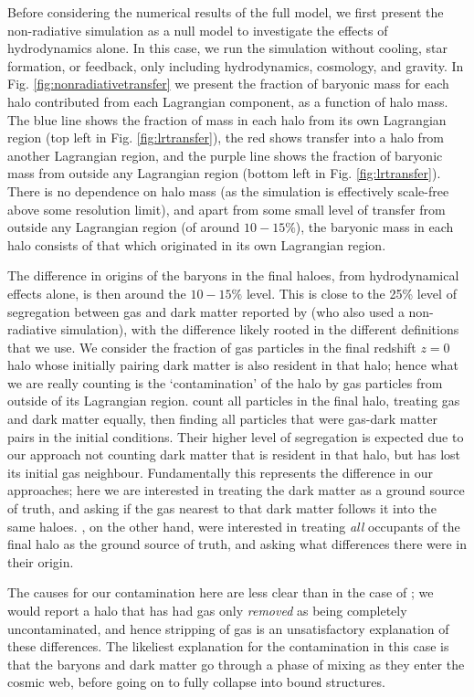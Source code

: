 Before considering the numerical results of the full model, we first present
the non-radiative simulation as a null model to investigate the effects of
hydrodynamics alone. In this case, we run the simulation without cooling,
star formation, or feedback, only including hydrodynamics, cosmology, and
gravity. In Fig. \ref{fig:nonradiativetransfer} we present the fraction of
baryonic mass for each halo contributed from each Lagrangian component, as a
function of halo mass. The blue line shows the fraction of mass in each halo
from its own Lagrangian region (top left in Fig. \ref{fig:lrtransfer}), the
red shows transfer into a halo from another Lagrangian region, and the purple
line shows the fraction of baryonic mass from outside any Lagrangian region
(bottom left in Fig. \ref{fig:lrtransfer}). There is no dependence on halo
mass (as the simulation is effectively scale-free above some resolution
limit), and apart from some small level of transfer from outside any
Lagrangian region (of around $10-15\%$), the baryonic mass in each halo
consists of that which originated in its own Lagrangian region.

The difference in origins of the baryons in the final haloes, from
hydrodynamical effects alone, is then around the $10-15\%$ level. This is
close to the 25\% level of segregation between gas and dark matter reported
by \citet{Liao2017} (who also used a non-radiative simulation), with the
difference likely rooted in the different definitions that we use. We
consider the fraction of gas particles in the final redshift $z=0$ halo whose
initially pairing dark matter is also resident in that halo; hence what we
are really counting is the `contamination' of the halo by gas particles from
outside of its Lagrangian region. \citet{Liao2017} count all particles in the
final halo, treating gas and dark matter equally, then finding all particles
that were gas-dark matter pairs in the initial conditions. Their higher level
of segregation is expected due to our approach not counting dark matter that
is resident in that halo, but has lost its initial gas neighbour. Fundamentally this
represents the difference in our approaches; here we are interested in
treating the dark matter as a ground source of truth, and asking if the gas
nearest to that dark matter follows it into the same haloes.
\citet{Liao2017}, on the other hand, were interested in treating \emph{all}
occupants of the final halo as the ground source of truth, and asking
what differences there were in their origin.

The causes for our contamination here are less clear than in the case of
\citet{Liao2017}; we would report a halo that has had gas only \emph{removed}
as being completely uncontaminated, and hence stripping of gas is
an unsatisfactory explanation of these differences. The likeliest explanation
for the contamination in this case is that the baryons and dark matter go through
a phase of mixing as they enter the cosmic web, before going on to fully
collapse into bound structures.


